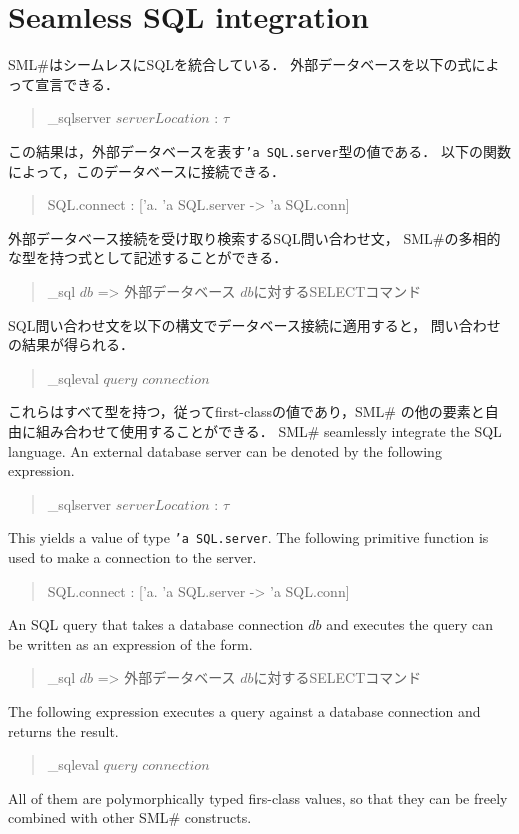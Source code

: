 \documentclass{jbook}
\newcommand{\txt}[2]{#2}
\newcommand{\smlsharp}{SML\#}
\newenvironment{program}{\begin{quote}\begin{tt}}%
                        {\end{tt}\end{quote}}
\begin{document}
\section{\txt{SQL統合}{Seamless SQL integration}}
\ifjp%
	\smlsharp{}はシームレスにSQLを統合している．
	外部データベースを以下の式によって宣言できる．
\begin{program}
\_sqlserver $serverLocation$ : $\tau$
\end{program}
	この結果は，外部データベースを表す{\tt 'a SQL.server}型の値である．
	以下の関数によって，このデータベースに接続できる．
\begin{program}
SQL.connect : ['a. 'a SQL.server -> 'a SQL.conn]
\end{program}
	外部データベース接続を受け取り検索するSQL問い合わせ文，
\smlsharp{}の多相的な型を持つ式として記述することができる．
\begin{program}
\_sql $db$ => 外部データベース $db$に対するSELECTコマンド
\end{program}
	SQL問い合わせ文を以下の構文でデータベース接続に適用すると，
問い合わせの結果が得られる．
\begin{program}
\_sqleval $query$ $connection$
\end{program}
	これらはすべて型を持つ，従ってfirst-classの値であり，\smlsharp{}
の他の要素と自由に組み合わせて使用することができる．
\else%
	\smlsharp{} seamlessly integrate the SQL language.
	An external database server can be denoted by the following
expression.

\begin{program}
\_sqlserver $serverLocation$ : $\tau$
\end{program}
	This yields a value of type {\tt 'a SQL.server}.
	The following primitive function is used to make a connection to
the server.
\begin{program}
SQL.connect : ['a. 'a SQL.server -> 'a SQL.conn]
\end{program}
	An SQL query that takes a database connection $db$ and executes
the query can be written as an expression of the form.
\begin{program}
\_sql $db$ => 外部データベース $db$に対するSELECTコマンド
\end{program}
	The following expression executes a query against a database
connection and returns the result.
\begin{program}
\_sqleval $query$ $connection$
\end{program}
	All of them are polymorphically typed firs-class values, so
that they can be freely combined with other \smlsharp{} constructs.
\fi%
\end{document}

